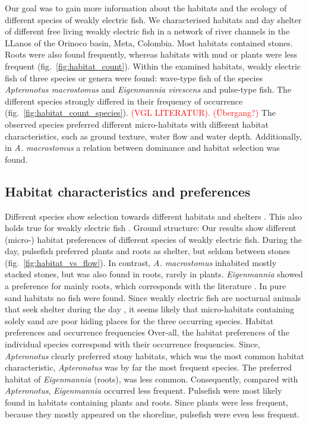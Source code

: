 
Our goal was to gain more information about the habitats and the ecology of different species of weakly electric fish. We characterised habitats and day shelter of different free living weakly electric fish in a network of river channels in the LLanos of the Orinoco basin, Meta, Colombia. Most habitats contained stones. Roots were also found frequently, whereas habitats with mud or plants were less frequent (fig.~\ref{fig:habitat_count}). Within the examined habitats, weakly electric fish of three species  or genera were found: wave-type fish of the species \textit{Apteronotus macrostomus} and \textit{Eigenmannia virescens} and pulse-type fish. The different species strongly differed in their frequency of occurrence (fig.~\ref{fig:habitat_count_species}). \textcolor{red}{(VGL LITERATUR). 
(Übergang?)}
The observed species preferred different micro-habitats with different habitat characteristics, such as ground texture, water flow and water depth. Additionally, in \textit{A. macrostomus} a relation between dominance and habitat selection was found. 

\subsection{Habitat characteristics and preferences}

Different species show selection towards different habitats and shelters \citep{redsalmon1995,sherry1989redstarts,downes1998heat}. This also holds true for weakly electric fish \citep{Hopkins_74,HAGEDORN1985,lissmann1965activity}. 
Ground structure: Our results show different (micro-) habitat preferences of different species of weakly electric fish.
During the day, pulsefish preferred plants and roots as shelter, but seldom between stones (fig.~\ref{fig:habitat_vs_flow}). In contrast, \textit{A. macrostomus} inhabited mostly stacked stones, but was also found in roots, rarely in plants. \textit{Eigenmannia} showed a preference for mainly roots, which corresponds with the literature \citep{Hopkins_74}. In pure sand habitats no fish were found. Since weakly electric fish are nocturnal animals \citep{lissmann1965activity} that seek shelter during the day \citep{Hopkins_74}, it seems likely that micro-habitats containing solely sand are poor hiding places for the three occurring species.
Habitat preferences and occurrence frequencies
Over-all, the habitat preferences of the individual species correspond with their occurrence frequencies. Since, \textit{Apteronotus} clearly preferred stony habitats, which was the most common habitat characteristic, \textit{Apteronotus} was by far the most frequent species. The preferred habitat of \textit{Eigenmannia} (roots), was less common. Consequently, compared with \textit{Apteronotus}, \textit{Eigenmannia} occurred less frequent. Pulsefish were most likely found in habitats containing plants and roots. Since plants were less frequent, because they mostly appeared on the shoreline, pulsefish were even less frequent. 



